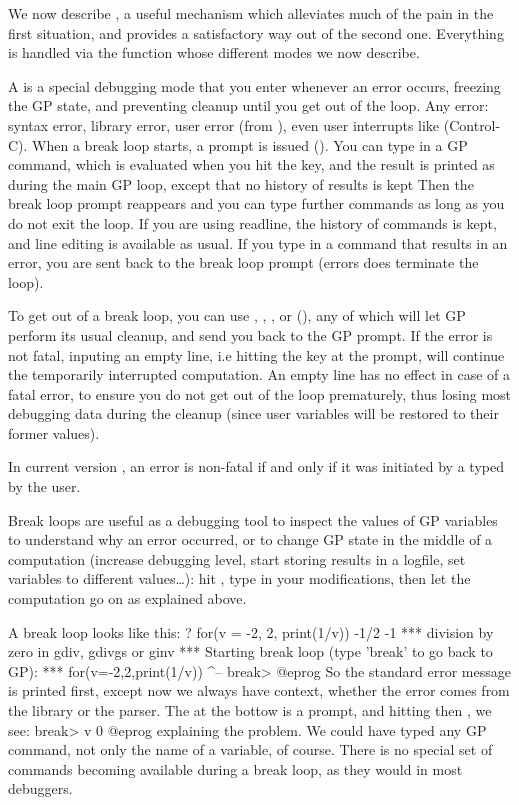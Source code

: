 We now describe , a useful mechanism which alleviates
much of the pain in the first situation, and provides a satisfactory way out
of the second one. Everything is handled via the  function whose
different modes we now describe.

\label{se:breakloop}

A  is a special debugging mode that you enter whenever an
error occurs, freezing the GP state, and preventing cleanup until you get out
of the loop. Any error: syntax error, library error, user error (from
), even user interrupts like  (Control-C). When a break
loop starts, a prompt is issued (). You can type in a GP command,
which is evaluated when you hit the  key, and the result is
printed as during the main GP loop, except that no history of results is kept
Then the break loop prompt reappears and you can type further commands as
long as you do not exit the loop. If you are using readline, the history of
commands is kept, and line editing is available as usual. If you type in a
command that results in an error, you are sent back to the break loop prompt
(errors does  terminate the loop).

To get out of a break loop, you can use , ,
, or  (), any of which will let GP perform its
usual cleanup, and send you back to the GP prompt. If the error is not fatal,
inputing an empty line, i.e hitting the  key at the
 prompt, will continue the temporarily interrupted computation.
An empty line has no effect in case of a fatal error, to ensure you do not
get out of the loop prematurely, thus losing most debugging data during the
cleanup (since user variables will be restored to their former values).

In current version \vers, an error is non-fatal if and only if it was
initiated by a  typed by the user.

Break loops are useful as a debugging tool to inspect the values of GP
variables to understand why an error occurred, or to change GP state in the
middle of a computation (increase debugging level, start storing results in a
logfile, set variables to different values\dots): hit , type in your
modifications, then let the computation go on as explained above.

A break loop looks like this:
\bprog
? for(v = -2, 2, print(1/v))
-1/2
-1
  ***   division by zero in gdiv, gdivgs or ginv
  ***   Starting break loop (type 'break' to go back to GP): 
  ***   for(v=-2,2,print(1/v))
                            ^--
break>
@eprog
\noindent So the standard error message is printed first, except now we always
have context, whether the error comes from the library or the parser. The
 at the bottow is a prompt, and hitting  then
, we see:
\bprog
break> v
0
@eprog
\noindent explaining the problem. We could have typed any GP command, not
only the name of a variable, of course. There is no special set of commands
becoming available during a break loop, as they would in most debuggers.

